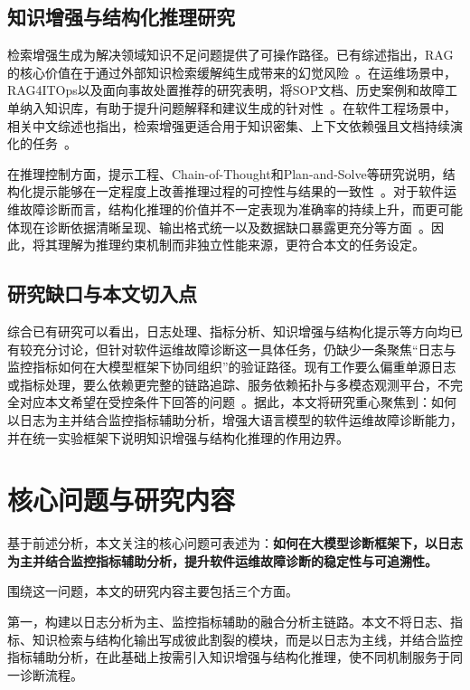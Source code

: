 \subsection{知识增强与结构化推理研究}

检索增强生成为解决领域知识不足问题提供了可操作路径。已有综述指出，RAG的核心价值在于通过外部知识检索缓解纯生成带来的幻觉风险~\cite{gao2023ragsurvey,li2025ragsurveycn}。在运维场景中，RAG4ITOps以及面向事故处置推荐的研究表明，将SOP文档、历史案例和故障工单纳入知识库，有助于提升问题解释和建议生成的针对性~\cite{zhang2024rag4itops,isaza2024ragincident}。在软件工程场景中，相关中文综述也指出，检索增强更适合用于知识密集、上下文依赖强且文档持续演化的任务~\cite{zhang2026ragsecn}。

在推理控制方面，提示工程、Chain-of-Thought和Plan-and-Solve等研究说明，结构化提示能够在一定程度上改善推理过程的可控性与结果的一致性~\cite{liu2023prompt,wei2022cot,wang2023planandsolve}。对于软件运维故障诊断而言，结构化推理的价值并不一定表现为准确率的持续上升，而更可能体现在诊断依据清晰呈现、输出格式统一以及数据缺口暴露更充分等方面~\cite{roy2024agents,szandala2025reliability,huang2025llmsafety}。因此，将其理解为推理约束机制而非独立性能来源，更符合本文的任务设定。

\subsection{研究缺口与本文切入点}

综合已有研究可以看出，日志处理、指标分析、知识增强与结构化提示等方向均已有较充分讨论，但针对软件运维故障诊断这一具体任务，仍缺少一条聚焦“日志与监控指标如何在大模型框架下协同组织”的验证路径。现有工作要么偏重单源日志或指标处理，要么依赖更完整的链路追踪、服务依赖拓扑与多模态观测平台，不完全对应本文希望在受控条件下回答的问题~\cite{zhang2024fdsurvey,zhang2024rag4itops,isaza2024ragincident}。据此，本文将研究重心聚焦到：如何以日志为主并结合监控指标辅助分析，增强大语言模型的软件运维故障诊断能力，并在统一实验框架下说明知识增强与结构化推理的作用边界。

\section{核心问题与研究内容}

基于前述分析，本文关注的核心问题可表述为：\textbf{如何在大模型诊断框架下，以日志为主并结合监控指标辅助分析，提升软件运维故障诊断的稳定性与可追溯性。}

围绕这一问题，本文的研究内容主要包括三个方面。

第一，构建以日志分析为主、监控指标辅助的融合分析主链路。本文不将日志、指标、知识检索与结构化输出写成彼此割裂的模块，而是以日志为主线，并结合监控指标辅助分析，在此基础上按需引入知识增强与结构化推理，使不同机制服务于同一诊断流程。

